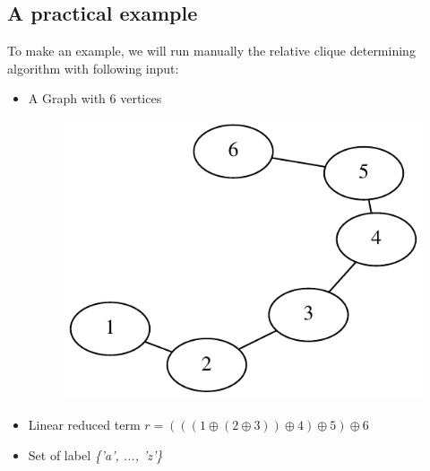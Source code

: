 \documentclass[a4paper, 12pt]{article}
\begin{document}
\subsection{A practical example}

To make an example, we will run manually the relative clique determining algorithm with following input:
\begin{itemize}
\item A Graph with 6 vertices\\
 
\begin{figure}[H]
\centering{}
\includegraphics[scale=0.5]{image/graph_example}
\end{figure}

\item Linear reduced term $r=(((1\oplus(2\oplus3))\oplus4)\oplus5)\oplus6$
\item Set of label \textit {\{'a', ..., 'z'\}}
\end{itemize}
\end{document}
